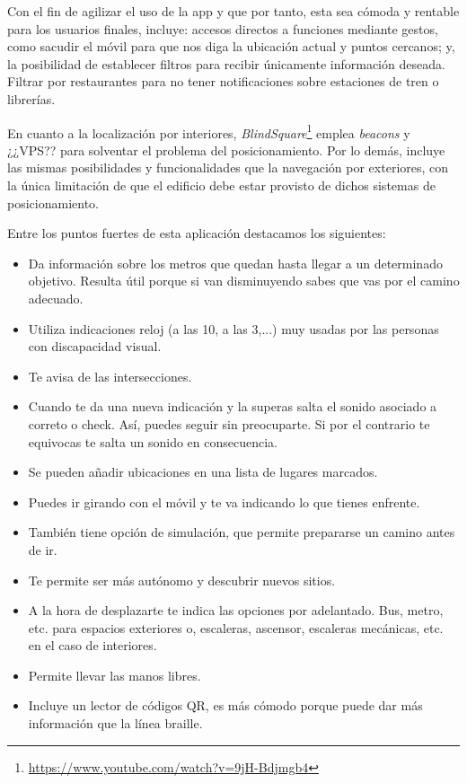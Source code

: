 Con el fin de agilizar el uso de la app y que por tanto, esta sea cómoda y rentable para los usuarios finales, incluye: accesos directos a funciones mediante gestos, como sacudir el móvil para que nos diga la ubicación actual y puntos cercanos; y, la posibilidad de establecer filtros para recibir únicamente información deseada. Filtrar por restaurantes para no tener notificaciones sobre estaciones de tren o librerías.

En cuanto a la localización por interiores, \textit{BlindSquare}\footnote{\url{https://www.youtube.com/watch?v=9jH-Bdjmgb4}} emplea \textit{beacons} y ¿¿VPS?? para solventar el problema del posicionamiento. Por lo demás, incluye las mismas posibilidades y funcionalidades que la navegación por exteriores, con la única limitación de que el edificio debe estar provisto de dichos sistemas de posicionamiento.

Entre los puntos fuertes de esta aplicación destacamos los siguientes:
\begin{itemize}
	\item Da información sobre los metros que quedan hasta llegar a un determinado objetivo. Resulta útil porque si van disminuyendo sabes que vas por el camino adecuado.
	\item Utiliza indicaciones reloj (a las 10, a las 3,...) muy usadas por las personas con discapacidad visual.
	\item Te avisa de las intersecciones. 
	\item Cuando te da una nueva indicación y la superas salta el sonido asociado a correto o check. Así, puedes seguir sin preocuparte. Si por el contrario te equivocas te salta un sonido en consecuencia.
	\item Se pueden añadir ubicaciones en una lista de lugares marcados.
	\item Puedes ir girando con el móvil y te va indicando lo que tienes enfrente. 
	\item También tiene opción de simulación, que permite prepararse un camino antes de ir.
	\item Te permite ser más autónomo y descubrir nuevos sitios.
	\item A la hora de desplazarte te indica las opciones por adelantado. Bus, metro, etc. para espacios exteriores o, escaleras, ascensor, escaleras mecánicas, etc. en el caso de interiores.
	\item Permite llevar las manos libres.
	\item Incluye un lector de códigos QR, es más cómodo porque puede dar más información que la línea braille.
\end{itemize}

